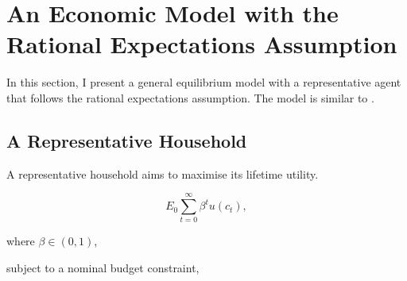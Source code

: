 \documentclass[hidelinks]{article}
\begin{document}
 
\section{An Economic Model with the Rational Expectations Assumption}
\label{model}

In this section, I present a general equilibrium model with a representative agent that follows the rational expectations assumption. The model is similar to \cite{Sims1994}.


\subsection{A Representative Household}

A representative household aims to maximise its lifetime utility.

\begin{equation}
	E_0\sum_{t=0}^{\infty} \beta^t u(c_t),
\end{equation}

where $\beta \in (0,1)$,

subject to a nominal budget constraint,










\end{document}
